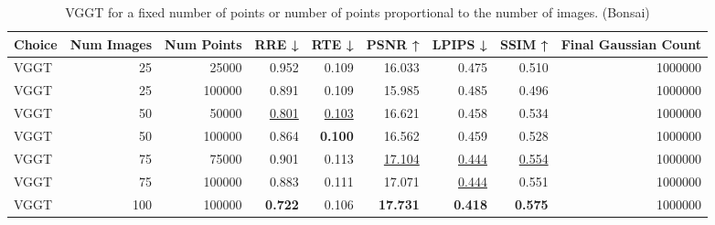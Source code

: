 \begin{table}[H]
\caption{VGGT for a fixed number of points or number of points proportional to the number of images. (Bonsai)}
\label{tab:01_num_images_fixed_points_bonsai}
\small
\begin{tabular}{lrrrrrrrr}
\toprule
Choice & Num Images & Num Points & RRE ↓ & RTE ↓ & PSNR ↑ & LPIPS ↓ & SSIM ↑ & Final Gaussian Count \\
\midrule
VGGT & 25 & 25000 & 0.952 & 0.109 & 16.033 & 0.475 & 0.510 & 1000000 \\
VGGT & 25 & 100000 & 0.891 & 0.109 & 15.985 & 0.485 & 0.496 & 1000000 \\
VGGT & 50 & 50000 & \underline{0.801} & \underline{0.103} & 16.621 & 0.458 & 0.534 & 1000000 \\
VGGT & 50 & 100000 & 0.864 & \textbf{0.100} & 16.562 & 0.459 & 0.528 & 1000000 \\
VGGT & 75 & 75000 & 0.901 & 0.113 & \underline{17.104} & \underline{0.444} & \underline{0.554} & 1000000 \\
VGGT & 75 & 100000 & 0.883 & 0.111 & 17.071 & \underline{0.444} & 0.551 & 1000000 \\
VGGT & 100 & 100000 & \textbf{0.722} & 0.106 & \textbf{17.731} & \textbf{0.418} & \textbf{0.575} & 1000000 \\
\bottomrule
\end{tabular}
\end{table}